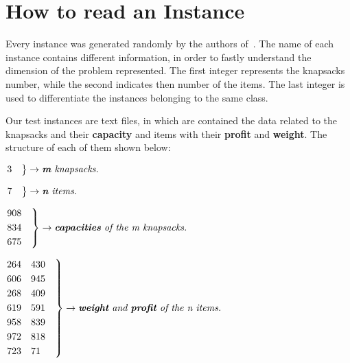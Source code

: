 \section{How to read an Instance}
Every instance was generated randomly by the authors of~\cite{mkp:2019}.
The name of each instance contains different information, in order to fastly understand the dimension of the problem represented.
The first integer represents the knapsacks number, while the second indicates then number of the items.
The last integer is used to differentiate the instances belonging to the same class.

Our test instances are text files, in which are contained the data related to the knapsacks and their \textbf{capacity} and items with their \textbf{profit} and \textbf{weight}. The structure of each of them shown below:

	\begin{flushleft} 
		$\begin{rcases*}
			3 \quad
		\end{rcases*} \rightarrow \textit{\textbf{m} knapsacks.}$
	\end{flushleft}
	\begin{flushleft}
		$\begin{rcases*}
			7 \quad
		\end{rcases*} \rightarrow \textit{\textbf{n} items.}$
	\end{flushleft}

	\begin{flushleft}
		$\begin{rcases*}
			908 \quad
			\\834 
			\\675 
		\end{rcases*} \rightarrow \textit{\textbf{capacities} of the m knapsacks.}$
	\end{flushleft}
	\begin{flushleft}
		$\begin{rcases*}
			264	\quad 430 \quad
			\\606 \quad	945
			\\268 \quad	409
			\\619 \quad	591
			\\958 \quad	839
			\\972 \quad	818
			\\723 \quad	71
		\end{rcases*} \rightarrow \textit{\textbf{weight} and \textbf{profit} of the n items.}$
	\end{flushleft}

